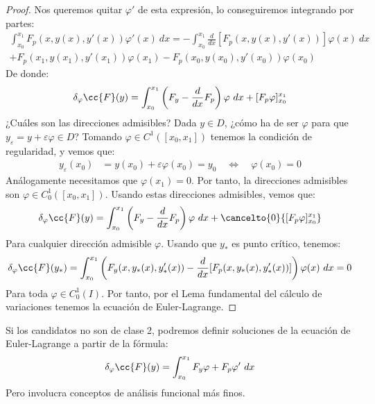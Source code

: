 \begin{teo}
\begin{proof}
        Nos queremos quitar $\varphi'$ de esta expresión, lo conseguiremos integrando por partes:
        \begin{multline*}
            \int_{x_0}^{x_1} F_p(x,y(x),y'(x))\varphi'(x)~dx  = -\int_{x_0}^{x_1} \frac{d}{dx}[F_p(x,y(x),y'(x))]\varphi(x)~dx \\+ F_p(x_1,y(x_1),y'(x_1))\varphi(x_1) - F_p(x_0,y(x_0),y'(x_0))\varphi(x_0)
        \end{multline*}
        De donde:
        \begin{equation*}
            \delta_\varphi \cc{F}(y) = \int_{x_0}^{x_1} \left(F_y - \frac{d}{dx}F_p\right)\varphi~dx  + [F_p\varphi]_{x_0}^{x_1}
        \end{equation*}
        ¿Cuáles son las direcciones admisibles? Dada $y\in D$, ¿cómo ha de ser $\varphi$ para que $y_\varepsilon = y+\varepsilon\varphi \in D$? Tomando $\varphi \in C^1([x_0,x_1])$ tenemos la condición de regularidad, y vemos que:
        \begin{align*}
            y_\varepsilon(x_0) &= y(x_0) + \varepsilon\varphi(x_0) = y_0 \quad\Longleftrightarrow\quad \varphi(x_0) = 0
        \end{align*}
        Análogamente necesitamos que $\varphi(x_1) = 0$. Por tanto, la direcciones admisibles son $\varphi \in C^1_0([x_0,x_1])$. Usando estas direcciones admisibles, vemos que:
        \begin{equation*}
            \delta_\varphi \cc{F}(y) = \int_{x_0}^{x_1} \left(F_y - \frac{d}{dx}F_p\right)\varphi~dx  + \cancelto{0}{[F_p\varphi]_{x_0}^{x_1}}
        \end{equation*}
        Para cualquier dirección admisible $\varphi$. Usando que $y_\ast$ es punto crítico, tenemos:
        \begin{equation*}
            \delta_\varphi \cc{F}(y_\ast) = \int_{x_0}^{x_1}\left( F_y(x,y_\ast(x),y_\ast'(x)) - \frac{d}{dx}[F_p(x,y_\ast(x),y_\ast'(x))]\right)\varphi(x)~dx  = 0
        \end{equation*}
        Para toda $\varphi \in C_0^1(I)$. Por tanto, por el Lema fundamental del cálculo de variaciones tenemos la ecuación de Euler-Lagrange.
    \end{proof}
\end{teo}

\noindent
Si los candidatos no son de clase 2, podremos definir soluciones de la ecuación de Euler-Lagrange a partir de la fórmula:
\begin{equation*}
    \delta_\varphi\cc{F}(y) = \int_{x_0}^{x_1} F_y\varphi + F_p \varphi'~dx 
\end{equation*}
Pero involucra conceptos de análisis funcional más finos.

